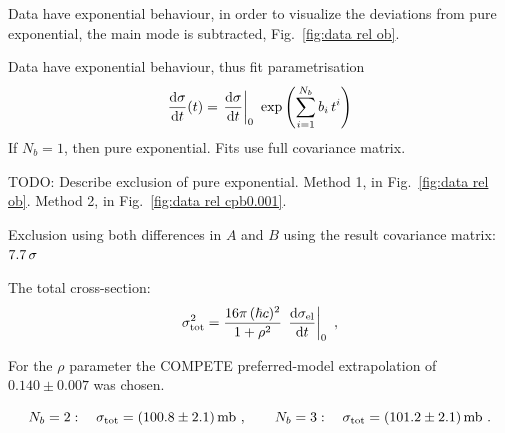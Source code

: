 \documentclass[TOTEM]{cern/cernphprep}
\def\d{{\rm d}}
\def\un#1{\,{\rm #1}}
\begin{document}
Data have exponential behaviour, in order to visualize the deviations from pure exponential, the main mode is subtracted, Fig.~\ref{fig:data rel ob}.

Data have exponential behaviour, thus fit parametrisation
\begin{equation}
\label{fit param}
{\d\sigma\over\d t}(t) = \left. \d\sigma\over\d t\right|_{0} \ \exp\left( \sum\limits_{i = 1}^{N_{b}} b_i\, t^i \right)
\end{equation}
If $N_b = 1$, then pure exponential.
Fits use full covariance matrix.

TODO: Describe exclusion of pure exponential. Method 1, in Fig.~\ref{fig:data rel ob}. Method 2, in Fig.~\ref{fig:data rel cpb0.001}.

Exclusion using both differences in $A$ and $B$ using the result covariance matrix: $7.7\un{\sigma}$

The total cross-section:
\begin{equation}
\label{eq:si tot}
\sigma_{\rm tot}^2 = {16\pi\, (\hbar c)^2\over 1 + \rho^2}\, \left. \d\sigma_{\rm el}\over\d t\right|_0\ ,
\end{equation}

For the $\rho$ parameter the COMPETE \cite{compete} preferred-model extrapolation of $0.140\pm 0.007$ was chosen.

\begin{equation}
\label{eq:si tot results}
N_b = 2:\quad \sigma_{\rm tot} = (100.8 \pm 2.1)\un{mb}\ ,\qquad	%
N_b = 3:\quad \sigma_{\rm tot} = (101.2 \pm 2.1)\un{mb}\ .			%
\end{equation}
\end{document}
